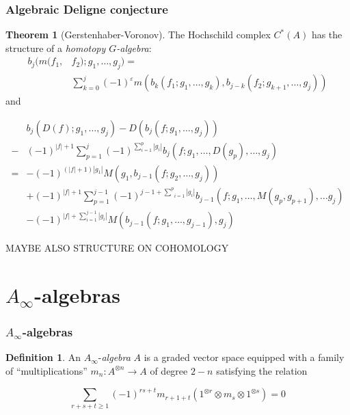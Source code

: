 \documentclass{beamer}
\theoremstyle{definition}
\newtheorem{theo}{Theorem}
\newtheorem{defi}{Definition}
\begin{document}
\begin{frame}
\frametitle{Algebraic Deligne conjecture}
\begin{theo}[Gerstenhaber-Voronov]
 The Hochschild complex $C^*(A)$ has the structure of a \emph{homotopy $G$-algebra}:\pause
 \begin{align*}
 b_j(m(f_1,&f_2);g_1,\dots,g_j) = \\
 &\sum_{k=0}^j (-1)^\varepsilon m(b_k(f_1;g_1,\dots, g_k),b_{j-k}(f_2;g_{k+1},\dots, g_j))
 \end{align*}
 and
\end{theo}
\end{frame}
\begin{frame}
\begin{block}{}
 \begin{align*}
&b_j(D(f);g_1,\dots, g_j)-D(b_j(f;g_1,\dots,g_j))\\
-&(-1)^{|f|+1}\sum_{p=1}^j(-1)^{\sum_{i=1}^p|g_i|}b_j(f;g_1,\dots,D(g_p),\dots, g_j)\\
=&-(-1)^{(|f|+1)|g_1|}M(g_1,b_{j-1}(f;g_2,\dots, g_j))\\
 &+(-1)^{|f|+1}\sum_{p=1}^{j-1}(-1)^{j-1+\underset{i=1}{\overset{p}{\sum}}|g_i|}b_{j-1}(f;g_1,\dots,M(g_p,g_{p+1}),\dots g_j)\\
 &-(-1)^{|f|+\sum_{i=1}^{j-1}|g_i|}M(b_{j-1}(f;g_1,\dots, g_{j-1}),g_j)
\end{align*}
\end{block}
\end{frame}


\begin{frame}
MAYBE ALSO STRUCTURE ON COHOMOLOGY
\end{frame}

\section{$A_\infty$-algebras}


\begin{frame}
\frametitle{$A_\infty$-algebras}
\begin{defi}
An $A_\infty$-\emph{algebra} $A$ is a graded vector space equipped with a family of ``multiplications'' $m_n:A^{\otimes n}\to A$ of degree $2-n$ satisfying the relation %

\[\sum_{r+s+t\geq 1}(-1)^{rs+t}m_{r+1+t}(1^{\otimes r}\otimes m_s\otimes 1^{\otimes s})=0\] %
\end{defi}
\end{frame}
\end{document}
